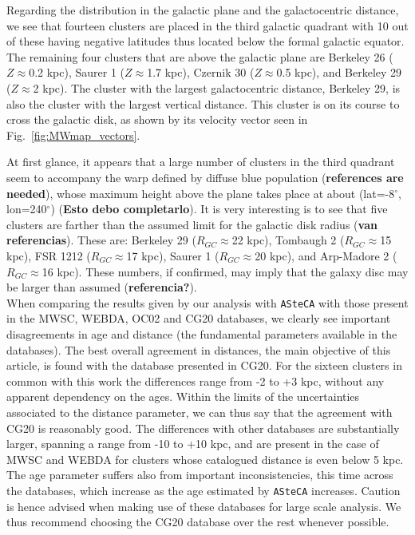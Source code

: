 \documentclass[draft]{aa}
\begin{document}
  Regarding the distribution in the galactic plane and the galactocentric
  distance, we see that fourteen clusters are placed in the third galactic
  quadrant with 10 out of these having negative latitudes thus located below the
  formal galactic equator. The remaining four clusters that are above the
  galactic plane are Berkeley 26 ($Z\approx$0.2 kpc), Saurer 1
  ($Z\approx$1.7 kpc), Czernik 30 ($Z\approx$0.5 kpc), and Berkeley
  29 ($Z\approx$2 kpc). The cluster with the largest galactocentric distance,
  Berkeley 29, is also the cluster with the largest vertical distance. This
  cluster is on its course to cross the galactic disk, as shown by its velocity
  vector seen in Fig.~\ref{fig:MWmap_vectors}.

  At first glance, it appears that a large number of clusters in the third
  quadrant seem to accompany the warp defined by diffuse blue population
  (\textbf{references are needed}), whose maximum height above the plane takes
  place at about (lat=-8$^{\circ}$, lon=240$^{\circ}$)
  (\textbf{Esto debo completarlo}).
  It is very interesting is to see that five clusters are farther than the
  assumed limit for the galactic disk radius (\textbf{van referencias}). These
  are: Berkeley 29 ($R_{GC}\approx$22 kpc), Tombaugh 2 ($R_{GC}\approx$15
  kpc), FSR 1212 ($R_{GC}\approx$17 kpc), Saurer 1 ($R_{GC}\approx$20 kpc),
  and Arp-Madore 2 ($R_{GC}\approx$16 kpc). These numbers, if confirmed, may
  imply that the galaxy disc may be larger than assumed (\textbf{referencia?}).\\

  When comparing the results given by our analysis with \texttt{ASteCA} with
  those present in the MWSC, WEBDA, OC02 and CG20 databases, we clearly
  see important disagreements in age and distance (the fundamental parameters
  available in the databases).
  The best overall agreement in distances, the main objective of this article,
  is found with the database presented in CG20. For the sixteen clusters in
  common with this work the differences range from -2 to +3 kpc, without any
  apparent dependency on the ages.
  Within the limits of the uncertainties associated to the distance parameter,
  we can thus say that the agreement with CG20 is reasonably good.
  The differences with other databases are substantially larger, spanning a
  range from -10 to +10 kpc, and are present in the case of MWSC and WEBDA for
  clusters whose catalogued distance is even below 5 kpc.
  The age parameter suffers also from important inconsistencies, this time
  across the databases, which increase as the age estimated by \texttt{ASteCA}
  increases.
  Caution is hence advised when making use of these databases for large scale
  analysis. We thus recommend choosing the CG20 database over the rest whenever
  possible.
\end{document}
